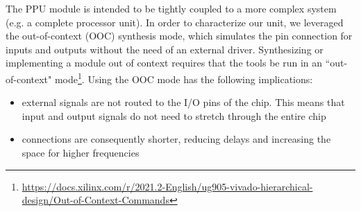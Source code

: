 The PPU module is intended to be tightly coupled to a more complex system (e.g. a complete processor unit). In order to characterize our unit, we leveraged the out-of-context (OOC) synthesis mode, which simulates the pin connection for inputs and outputs without the need of an external driver.
Synthesizing or implementing a module out of context requires that the tools be run in an ``out-of-context" mode\footnote{\url{https://docs.xilinx.com/r/2021.2-English/ug905-vivado-hierarchical-design/Out-of-Context-Commands}}.
Using the OOC mode has the following implications:
\begin{itemize}
\item external signals are not routed to the I/O pins of the chip. This means that input and output signals do not need to stretch through the entire chip
\item connections are consequently shorter, reducing delays and increasing the space for higher frequencies
\end{itemize}

